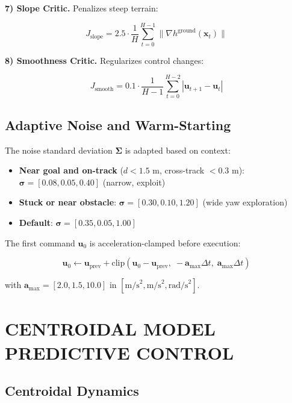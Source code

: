 \documentclass[11pt,a4paper]{article}
\begin{document}
\textbf{7) Slope Critic.} Penalizes steep terrain:

\begin{equation}
J_{\text{slope}} = 2.5 \cdot \frac{1}{H}\sum_{t=0}^{H-1} \|\nabla h^{\text{ground}}(\mathbf{x}_t)\|
\end{equation}

\textbf{8) Smoothness Critic.} Regularizes control changes:

\begin{equation}
J_{\text{smooth}} = 0.1 \cdot \frac{1}{H-1}\sum_{t=0}^{H-2} |\mathbf{u}_{t+1} - \mathbf{u}_t|
\end{equation}

\subsection{Adaptive Noise and Warm-Starting}

The noise standard deviation $\boldsymbol{\Sigma}$ is adapted based on context:

\begin{itemize}
\item \textbf{Near goal and on-track} ($d < 1.5$ m, cross-track $< 0.3$ m): $\boldsymbol{\sigma} = [0.08, 0.05, 0.40]$ (narrow, exploit)
\item \textbf{Stuck or near obstacle}: $\boldsymbol{\sigma} = [0.30, 0.10, 1.20]$ (wide yaw exploration)
\item \textbf{Default}: $\boldsymbol{\sigma} = [0.35, 0.05, 1.00]$
\end{itemize}

The first command $\mathbf{u}_0$ is acceleration-clamped before execution:

\begin{equation}
\mathbf{u}_0 \leftarrow \mathbf{u}_{\text{prev}} + \text{clip}(\mathbf{u}_0 - \mathbf{u}_{\text{prev}},\; -\mathbf{a}_{\max}\Delta t,\; \mathbf{a}_{\max}\Delta t)
\end{equation}

with $\mathbf{a}_{\max} = [2.0, 1.5, 10.0]$ in $[\text{m/s}^2, \text{m/s}^2, \text{rad/s}^2]$.

\section{CENTROIDAL MODEL PREDICTIVE CONTROL}

\subsection{Centroidal Dynamics}
\end{document}
